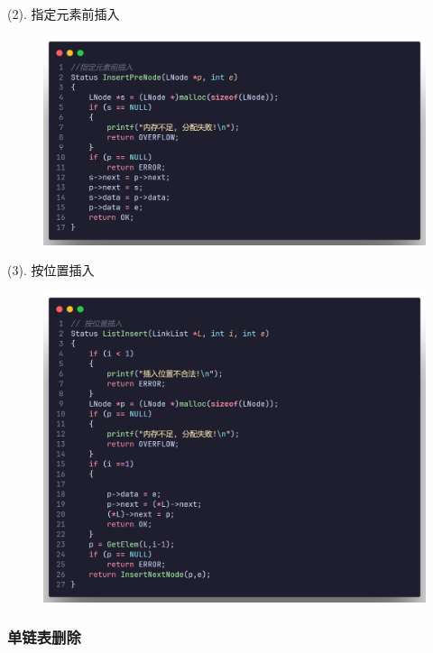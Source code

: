 (2). 指定元素前插入

\begin{figure}[H]
    \centering
    \includegraphics[scale=0.2]{"figure/Note/LinearList/SlFInsert.png"}
\end{figure}

(3). 按位置插入

\begin{figure}[H]
    \centering
    \includegraphics[scale=0.2]{"figure/Note/LinearList/SlInsert.png"}
\end{figure}

\subsubsection{单链表删除}

